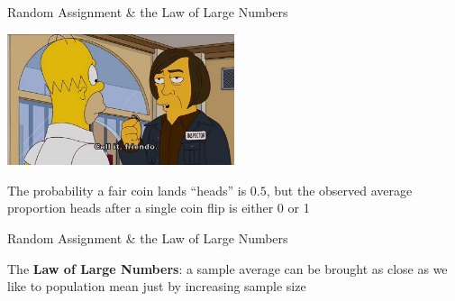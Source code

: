 \documentclass[10pt,xcolor=table,ignorenonframetext,handout,aspectratio=169]{beamer}
\begin{document}

\begin{frame}{Random Assignment \& the Law of Large Numbers}

\medskip

\begin{center}
	\includegraphics[width=0.5\textwidth]{img/simpsons-coin-flip.jpg}
\end{center}

\medskip
\begin{center}
The probability a fair coin lands ``heads'' is $0.5$, but the observed average proportion heads after a single coin flip is either 0 or 1
\end{center}
\end{frame}



\begin{frame}{Random Assignment \& the Law of Large Numbers}

\medskip

\begin{center}
\end{center}

The \textbf{Law of Large Numbers}: a sample average can be brought as close as we like to population mean just by increasing sample size

\end{frame}
\end{document}
